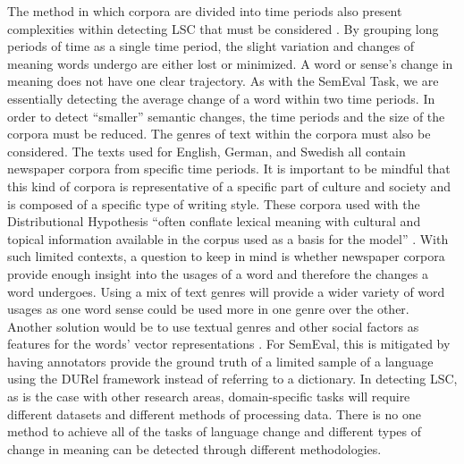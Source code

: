 The method in which corpora are divided into time periods also present complexities within detecting LSC that must be considered \citep{hengchen2021challenges}. By grouping long periods of time as a single time period, the slight variation and changes of meaning words undergo are either lost or minimized. A word or sense’s change in meaning does not have one clear trajectory. As with the SemEval Task, we are essentially detecting the average change of a word within two time periods. In order to detect “smaller” semantic changes, the time periods and the size of the corpora must be reduced. The genres of text within the corpora must also be considered. The texts used for English, German, and Swedish all contain newspaper corpora from specific time periods. It is important to be mindful that this kind of corpora is representative of a specific part of culture and society and is composed of a specific type of writing style. These corpora used with the Distributional Hypothesis “often conflate lexical meaning with cultural and topical information available in the corpus used as a basis for the model” \citep{hengchen2021challenges}. With such limited contexts, a question to keep in mind is whether newspaper corpora provide enough insight into the usages of a word and therefore the changes a word undergoes. Using a mix of text genres will provide a wider variety of word usages as one word sense could be used more in one genre over the other. Another solution would be to use textual genres and other social factors as features for the words' vector representations \citep{perrone-etal-2019-gasc, jawahar-seddah-2019-contextualized}. For SemEval, this is mitigated by having annotators provide the ground truth of a limited sample of a language using the DURel framework \citep{DURel2018} instead of referring to a dictionary. In detecting LSC, as is the case with other research areas, domain-specific tasks will require different datasets and different methods of processing data. There is no one method to achieve all of the tasks of language change and different types of change in meaning can be detected through different methodologies. 
